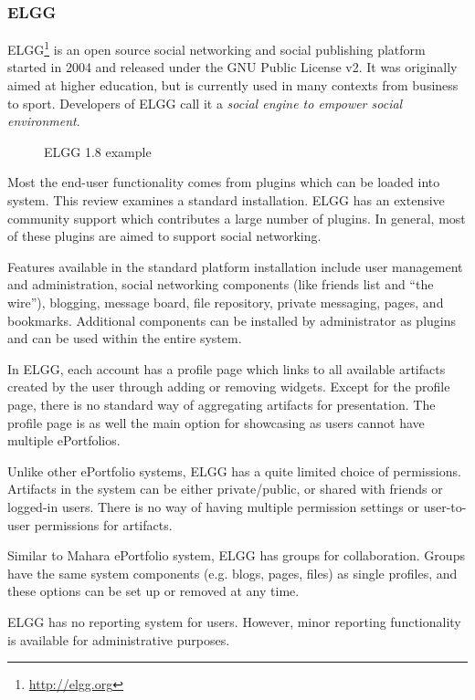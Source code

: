 \subsubsection{ELGG}
ELGG\footnote{\url{http://elgg.org}} is an open source social networking and
social publishing platform started in 2004 and released under the GNU Public
License v2. It was originally aimed at higher education, but is currently used
in many contexts from business to sport. Developers of ELGG call it a
\textit{social engine to empower social environment}.

\begin{figure}[htb]
\centering
\setlength\fboxsep{0pt}
\setlength\fboxrule{0.5pt}
\caption{ELGG 1.8 example}
\label{fig:elgg}
\end{figure}

Most the end-user functionality comes from plugins which can be loaded into
system. This review examines a standard installation. ELGG has an extensive
community support which contributes a large number of plugins. In general, most
of these plugins are aimed to support social networking.

Features available in the standard platform installation include user management
and administration, social networking components (like friends list and ``the
wire''), blogging, message board, file repository, private messaging, pages, and
bookmarks. Additional components can be installed by administrator as plugins
and can be used within the entire system.

In ELGG, each account has a profile page which links to all available artifacts
created by the user through adding or removing widgets. Except for the profile
page, there is no standard way of aggregating artifacts for presentation.
The profile page is as well the main option for showcasing as users cannot have
multiple ePortfolios.

Unlike other ePortfolio systems, ELGG has a quite limited choice of permissions.
Artifacts in the system can be either private/public, or shared with friends
or logged-in users. There is no way of having multiple permission settings or
user-to-user permissions for artifacts.

Similar to Mahara ePortfolio system, ELGG has groups for collaboration. Groups
have the same system components (e.g. blogs, pages, files) as single profiles,
and these options can be set up or removed at any time.

ELGG has no reporting system for users. However, minor reporting functionality
is available for administrative purposes.

